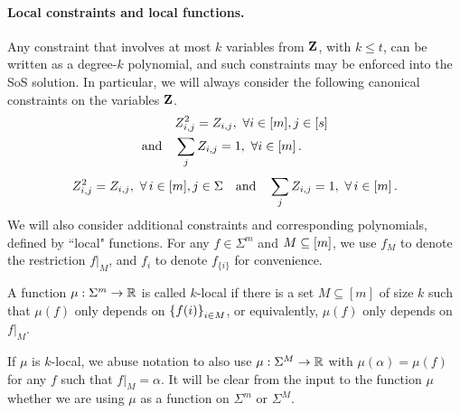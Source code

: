 %
%
\paragraph{Local constraints and local functions.}
%
Any constraint that involves at most $k$ variables from ${ \mathbf{Z} }$, with $k\leq t$, can be written as a degree-$k$ polynomial, and such constraints may be enforced into the SoS solution.
%
%
In particular, we will always consider the following canonical constraints on the variables ${ \mathbf{Z} }$.
\ifnum{}
\begin{align*}
&Z_{i,j}^2 = Z_{i,j},\ \forall i\in[m],j\in[s] \\
\text{and} \quad &\sum_j Z_{i,j} = 1,\ \forall i\in[m] \,.
\end{align*}
\else
\[
Z_{i,j}^2 = Z_{i,j},\ \forall \,i\in[m],j\in\Sigma
\quad \text{and} \quad 
\sum_j Z_{i,j} = 1,\ \forall\, i\in[m] \,.
\]
\fi
%
%
%
We will also consider additional constraints and corresponding polynomials, defined by ``local" functions. For any $f\in \Sigma^m$ and $M\subseteq [m]$, we use $f_M$ to denote the restriction $f|_M$, and $f_i$ to denote $f_{\{i\}}$ for convenience.
%
\begin{definition}
	A function $\mu: \Sigma^m \rightarrow {\mathbb R}$ is called $k$-local if there is a set $M\subseteq [m]$ of size $k$ such that $\mu(f)$ only depends on $\left\{f(i)\right\}_{i\in M}$, or equivalently, $\mu(f)$ only depends on $f|_M$.
	
	If $\mu$ is $k$-local, we abuse notation to also use $\mu: \Sigma^M \rightarrow {\mathbb R}$ with $\mu(\alpha) = \mu(f)$ for any $f$ such that $f|_M=\alpha$. It will be clear from the input to the function $\mu$ whether we are using $\mu$ as a function on $\Sigma^m$ or $\Sigma^M$.
\end{definition}

